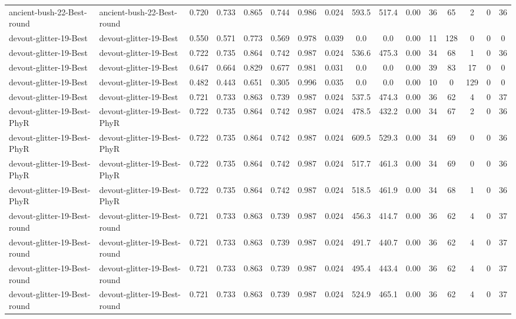\begin{table*}[p]
{\begin{tabular}{llcccccccccccccc}
      ancient-bush-22-Best-round & ancient-bush-22-Best-round & 0.720 & 0.733 & 0.865 & 0.744 & 0.986 & 0.024 & 593.5 & 517.4 & 0.00 & 36 & 65 & 2 & 0 & 36 \\
      devout-glitter-19-Best & devout-glitter-19-Best & 0.550 & 0.571 & 0.773 & 0.569 & 0.978 & 0.039 & 0.0 & 0.0 & 0.00 & 11 & 128 & 0 & 0 & 0 \\
      devout-glitter-19-Best & devout-glitter-19-Best & 0.722 & 0.735 & 0.864 & 0.742 & 0.987 & 0.024 & 536.6 & 475.3 & 0.00 & 34 & 68 & 1 & 0 & 36 \\
      devout-glitter-19-Best & devout-glitter-19-Best & 0.647 & 0.664 & 0.829 & 0.677 & 0.981 & 0.031 & 0.0 & 0.0 & 0.00 & 39 & 83 & 17 & 0 & 0 \\
      devout-glitter-19-Best & devout-glitter-19-Best & 0.482 & 0.443 & 0.651 & 0.305 & 0.996 & 0.035 & 0.0 & 0.0 & 0.00 & 10 & 0 & 129 & 0 & 0 \\
      devout-glitter-19-Best & devout-glitter-19-Best & 0.721 & 0.733 & 0.863 & 0.739 & 0.987 & 0.024 & 537.5 & 474.3 & 0.00 & 36 & 62 & 4 & 0 & 37 \\
      devout-glitter-19-Best-PhyR & devout-glitter-19-Best-PhyR & 0.722 & 0.735 & 0.864 & 0.742 & 0.987 & 0.024 & 478.5 & 432.2 & 0.00 & 34 & 67 & 2 & 0 & 36 \\
      devout-glitter-19-Best-PhyR & devout-glitter-19-Best-PhyR & 0.722 & 0.735 & 0.864 & 0.742 & 0.987 & 0.024 & 609.5 & 529.3 & 0.00 & 34 & 69 & 0 & 0 & 36 \\
      devout-glitter-19-Best-PhyR & devout-glitter-19-Best-PhyR & 0.722 & 0.735 & 0.864 & 0.742 & 0.987 & 0.024 & 517.7 & 461.3 & 0.00 & 34 & 69 & 0 & 0 & 36 \\
      devout-glitter-19-Best-PhyR & devout-glitter-19-Best-PhyR & 0.722 & 0.735 & 0.864 & 0.742 & 0.987 & 0.024 & 518.5 & 461.9 & 0.00 & 34 & 68 & 1 & 0 & 36 \\
      devout-glitter-19-Best-round & devout-glitter-19-Best-round & 0.721 & 0.733 & 0.863 & 0.739 & 0.987 & 0.024 & 456.3 & 414.7 & 0.00 & 36 & 62 & 4 & 0 & 37 \\
      devout-glitter-19-Best-round & devout-glitter-19-Best-round & 0.721 & 0.733 & 0.863 & 0.739 & 0.987 & 0.024 & 491.7 & 440.7 & 0.00 & 36 & 62 & 4 & 0 & 37 \\
      devout-glitter-19-Best-round & devout-glitter-19-Best-round & 0.721 & 0.733 & 0.863 & 0.739 & 0.987 & 0.024 & 495.4 & 443.4 & 0.00 & 36 & 62 & 4 & 0 & 37 \\
      devout-glitter-19-Best-round & devout-glitter-19-Best-round & 0.721 & 0.733 & 0.863 & 0.739 & 0.987 & 0.024 & 524.9 & 465.1 & 0.00 & 36 & 62 & 4 & 0 & 37 \\

\end{tabular}}
\end{table*}
